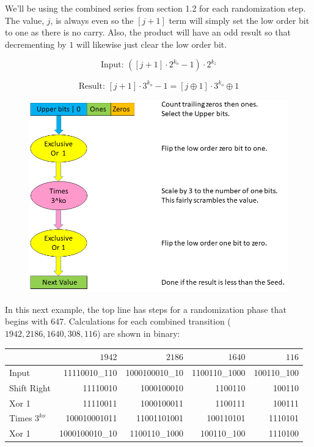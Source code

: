 \documentclass[preprint,natbib]{sigplanconf}
\begin{document}
We'll be using the combined series from section 1.2 for each randomization step. The value, $j$, is always even so the $[j + 1]$ term will simply set the low order bit to one as there is no carry. Also, the product will have an odd result so that decrementing by $1$ will likewise just clear the low order bit.

\[
    \text{Input: } ([j + 1] \cdot 2^{k_o} - 1) \cdot 2^{k_z}
\]

\[
    \text{Result: } [j + 1] \cdot 3^{k_o} - 1 = [j \oplus 1] \cdot 3^{k_o} \oplus 1
\]



\begin{figure}
    \includegraphics[width=\textwidth]{collatz_even}
\end{figure}

\newpage

In this next example, the top line has steps for a randomization phase that begins with $647$. Calculations for each combined transition ($1942, 2186, 1640, 308, 116$) are shown in binary:

\noindent
\begin{minipage}{\columnwidth}
    \setlength{\tabcolsep}{.35\tabcolsep}
    \centering
    \begin{tabular}{|l|r|r|r|r|}
        \hline
                       & \textbf{$1942$} & \textbf{$2186$} & \textbf{$1640$} & \textbf{$116$} \\
        \hline
        Input          & 11110010\_110   & 1000100010\_10  & 1100110\_1000   & 100110\_100    \\
        \hline
        Shift Right    & 11110010        & 1000100010      & 1100110         & 100110         \\
        \hline
        Xor 1          & 11110011        & 1000100011      & 1100111         & 100111         \\
        \hline
        Times $3^{ko}$ & 100010001011    & 11001101001     & 100110101       & 1110101        \\
        \hline
        Xor 1          & 1000100010\_10  & 1100110\_1000   & 100110\_100     & 1110100        \\
        \hline
    \end{tabular}
\end{minipage}
\end{document}
